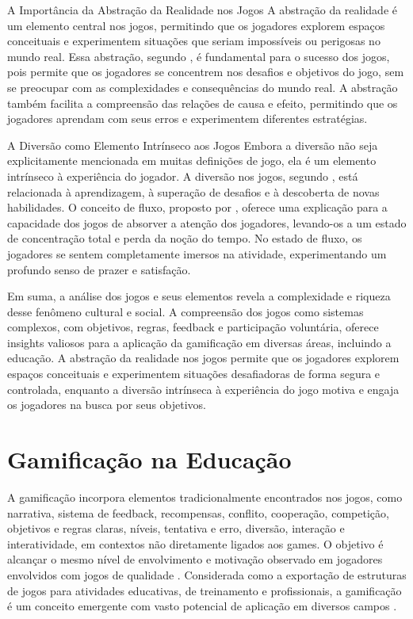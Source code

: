 A Importância da Abstração da Realidade nos Jogos
A abstração da realidade é um elemento central nos jogos, permitindo que os jogadores explorem espaços conceituais e experimentem situações que seriam impossíveis ou perigosas no mundo real. Essa abstração, segundo \cite{koster2005theory}, é fundamental para o sucesso dos jogos, pois permite que os jogadores se concentrem nos desafios e objetivos do jogo, sem se preocupar com as complexidades e consequências do mundo real. A abstração também facilita a compreensão das relações de causa e efeito, permitindo que os jogadores aprendam com seus erros e experimentem diferentes estratégias.

A Diversão como Elemento Intrínseco aos Jogos
Embora a diversão não seja explicitamente mencionada em muitas definições de jogo, ela é um elemento intrínseco à experiência do jogador. A diversão nos jogos, segundo \cite{koster2005theory}, está relacionada à aprendizagem, à superação de desafios e à descoberta de novas habilidades. O conceito de fluxo, proposto por \cite{csikszentmihalyi1990flow}, oferece uma explicação para a capacidade dos jogos de absorver a atenção dos jogadores, levando-os a um estado de concentração total e perda da noção do tempo. No estado de fluxo, os jogadores se sentem completamente imersos na atividade, experimentando um profundo senso de prazer e satisfação.

Em suma, a análise dos jogos e seus elementos revela a complexidade e riqueza desse fenômeno cultural e social. A compreensão dos jogos como sistemas complexos, com objetivos, regras, feedback e participação voluntária, oferece insights valiosos para a aplicação da gamificação em diversas áreas, incluindo a educação. A abstração da realidade nos jogos permite que os jogadores explorem espaços conceituais e experimentem situações desafiadoras de forma segura e controlada, enquanto a diversão intrínseca à experiência do jogo motiva e engaja os jogadores na busca por seus objetivos.

\section{Gamificação na Educação}

A gamificação incorpora elementos tradicionalmente encontrados nos jogos, como narrativa, sistema de feedback, recompensas, conflito, cooperação, competição, objetivos e regras claras, níveis, tentativa e erro, diversão, interação e interatividade, em contextos não diretamente ligados aos games. O objetivo é alcançar o mesmo nível de envolvimento e motivação observado em jogadores envolvidos com jogos de qualidade \cite{silva2017gamificaccao}. Considerada como a exportação de estruturas de jogos para atividades educativas, de treinamento e profissionais, a gamificação é um conceito emergente com vasto potencial de aplicação em diversos campos \cite{barbosa2021aplicativos, fardo2013gamificaccao}.

